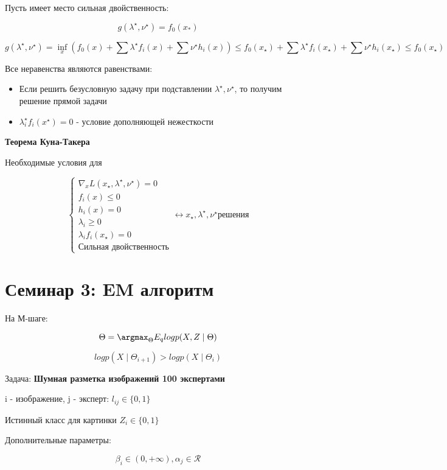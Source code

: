 \documentclass[a4paper, 12pt]{article}
\begin{document}
Пусть имеет место сильная двойственность:

\[g(\lambda^{\star}, \nu^{\star}) = f_0(x_{*})\]

\[g(\lambda^{\star}, \nu^{\star}) = \inf_x(f_0(x) + 
\sum \lambda^{\star} f_i(x) + \sum \nu^{\star} h_i(x))
\leq f_0(x_{\star}) + 
\sum \lambda^{\star} f_i(x_{\star}) + \sum \nu^{\star} h_i(x_{\star}) 
\leq f_0(x_{\star})\]

Все неравенства являются равенствами:

\begin{itemize}
    \item Если решить безусловную задачу при подставлении $\lambda^{\star}, \nu^{\star}$,
    то получим решение прямой задачи
    \item \(\lambda_i^{\star}f_{i}(x^{\star}) = 0\) - условие дополняющей нежесткости
\end{itemize}

\textbf{Теорема Куна-Такера}

Необходимые условия для 

\[
\begin{cases}
    \nabla_x L(x_{\star}, \lambda^{\star}, \nu^{\star}) = 0 \\
    f_i(x) \leq 0 \\
    h_i(x) = 0 \\
    \lambda_i \geq 0 \\
    \lambda_i f_i(x_{\star}) = 0 \\
    \textrm{Сильная двойственность}
\end{cases}
\leftrightarrow x_{\star}, \lambda^{\star}, \nu^{\star} \textrm{решения}
\]

\section{Семинар 3: EM алгоритм}

На М-шаге:

\[\Theta = \argmax_{\Theta} E_{q} log p(X, Z \mid \Theta)\]

\[log p(X \mid \Theta_{i + 1}) > log p(X \mid \Theta_{i})\]


Задача: \textbf{Шумная разметка изображений 100 экспертами}

i - изображение, j - эксперт: $l_{ij} \in \{0, 1\}$

Истинный класс для картинки $Z_i \in \{0, 1\}$

Дополнительные параметры:

\[\beta_i \in (0, +\infty), \alpha_j \in \mathcal{R}\]
\end{document}
